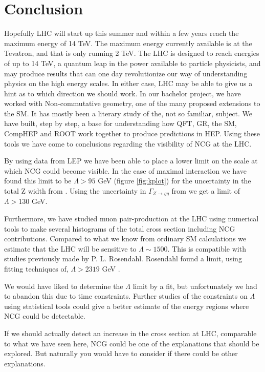 \section{Conclusion}
Hopefully LHC will start up this summer and within a few years reach the maximum energy of 14 TeV. The maximum energy currently available is at the Tevatron, and that is only running 2 TeV. The LHC is designed to reach energies of up to 14 TeV, a quantum leap in the power available to particle physicists, and may produce results that can one day revolutionize our way of understanding physics on the high energy scales. In either case, LHC may be able to give us a hint as to which direction we should work. In our bachelor project, we have worked with Non-commutative geometry, one of the many proposed extensions to the SM. It has mostly been a literary study of the, not so familiar, subject. We have built, step by step, a base for understanding how QFT, GR, the SM, CompHEP and ROOT work together to produce predictions in HEP. Using these tools we have come to conclusions regarding the visibility of NCG at the LHC.

By using data from LEP we have been able to place a lower limit on the scale at which NCG could become visible. In the case of maximal interaction we have found this limit to be $\Lambda > 95$ GeV (figure \ref{fig:kplot}) for the uncertainty in the total Z width from \cite{amsler2008rpp}. Using the uncertainty in $\Gamma_{Z \rightarrow gg}$ from \cite{behr2003dnc} we get a limit of $\Lambda > 130$ GeV.

Furthermore, we have studied muon pair-production at the LHC using numerical tools to make several histograms of the total cross section including NCG contributions. Compared to what we know from ordinary SM calculations we estimate that the LHC will be sensitive to $\Lambda \sim 1500$. This is compatible with studies previously made by P. L. Rosendahl. Rosendahl found a limit, using fitting techniques of, $\Lambda > 2319$ GeV \cite{rosendahl2008}. 

We would have liked to determine the $\Lambda$ limit by a fit, but unfortunately we had to abandon this due to time constraints. Further studies of the constraints on $\Lambda$ using statistical tools could give a better estimate of the energy regions where NCG could be detectable.   

If we should actually detect an increase in the cross section at LHC, comparable to what we have seen here, NCG could be one of the explanations that should be explored. But naturally you would have to consider if there could be other explanations.


